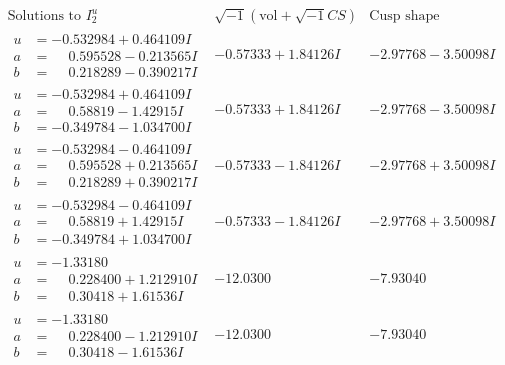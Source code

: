 \documentclass[1p]{elsarticle_modified}
\theoremstyle{definition}
\newcommand{\I}{\sqrt{-1}}
\begin{document}
$$\begin{array}{c|c|c}  
\text{Solutions to }I^u_{2}& \I (\text{vol} + \sqrt{-1}CS) & \text{Cusp shape}\\
 \hline 
\begin{aligned}
u &= -0.532984 + 0.464109 I \\
a &= \phantom{-}0.595528 - 0.213565 I \\
b &= \phantom{-}0.218289 - 0.390217 I\end{aligned}
 & -0.57333 + 1.84126 I & -2.97768 - 3.50098 I \\ \hline\begin{aligned}
u &= -0.532984 + 0.464109 I \\
a &= \phantom{-}0.58819 - 1.42915 I \\
b &= -0.349784 - 1.034700 I\end{aligned}
 & -0.57333 + 1.84126 I & -2.97768 - 3.50098 I \\ \hline\begin{aligned}
u &= -0.532984 - 0.464109 I \\
a &= \phantom{-}0.595528 + 0.213565 I \\
b &= \phantom{-}0.218289 + 0.390217 I\end{aligned}
 & -0.57333 - 1.84126 I & -2.97768 + 3.50098 I \\ \hline\begin{aligned}
u &= -0.532984 - 0.464109 I \\
a &= \phantom{-}0.58819 + 1.42915 I \\
b &= -0.349784 + 1.034700 I\end{aligned}
 & -0.57333 - 1.84126 I & -2.97768 + 3.50098 I \\ \hline\begin{aligned}
u &= -1.33180\phantom{ +0.000000I} \\
a &= \phantom{-}0.228400 + 1.212910 I \\
b &= \phantom{-}0.30418 + 1.61536 I\end{aligned}
 & -12.0300\phantom{ +0.000000I} & -7.93040\phantom{ +0.000000I} \\ \hline\begin{aligned}
u &= -1.33180\phantom{ +0.000000I} \\
a &= \phantom{-}0.228400 - 1.212910 I \\
b &= \phantom{-}0.30418 - 1.61536 I\end{aligned}
 & -12.0300\phantom{ +0.000000I} & -7.93040\phantom{ +0.000000I} \\ \hline\begin{aligned}

\end{aligned}
\end{array}$$
\end{document}
